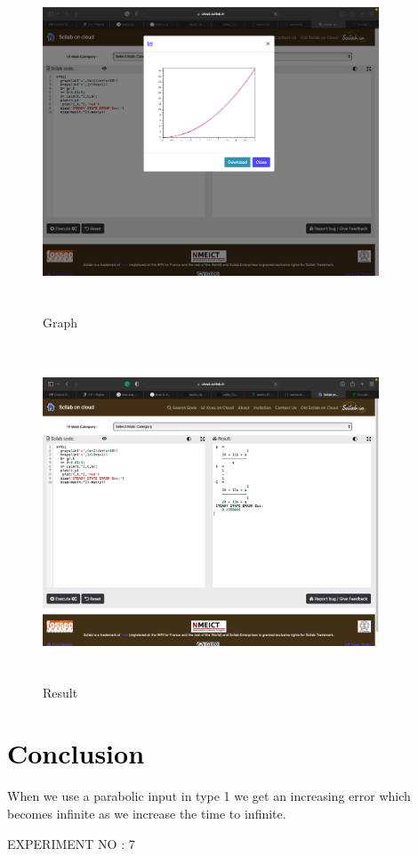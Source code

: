 \documentclass[12pt]{article}
\begin{document}
\begin{figure}[!hth]
        \centering
        \includegraphics[width =10cm, height = 10cm]{images/exp61.png}
        \caption{Graph}
        \label{Graph}
\end{figure}
\begin{figure}[!hth]
        \centering
        \includegraphics[width =10cm, height = 10cm]{images/exp62.png}
        \caption{Result}
        \label{Result}
\end{figure}


\section*{\textcolor{black}{Conclusion}}
 When we use a parabolic input in type 1 we get an increasing error which becomes infinite as we increase the time to infinite.
   \pagebreak
\maketitle
\begin{center}
    \LARGE {EXPERIMENT NO : 7}
             
\end{center}
\end{document}
